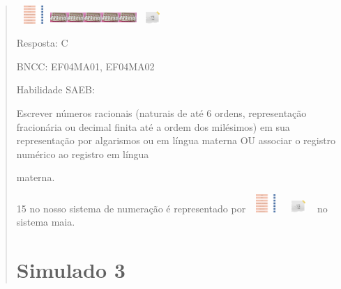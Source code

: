 \begin{enumerate}
\begin{escolha}
\begin{enumerate}
\begin{itemize}
\begin{itemize}
\begin{escolha}
\begin{quote}
\begin{escolha}
{\begin{enumerate}
  \includegraphics[width=0.50004in,height=0.26669in]{media/image14.png}\includegraphics[width=0.25836in,height=0.18335in]{media/image15.png}\includegraphics[width=0.25836in,height=0.18335in]{media/image15.png}\includegraphics[width=0.25836in,height=0.18335in]{media/image15.png}\includegraphics[width=0.25836in,height=0.18335in]{media/image15.png}\includegraphics[width=0.25836in,height=0.18335in]{media/image15.png}\includegraphics[width=0.47504in,height=0.18335in]{media/image16.png}
\end{enumerate}

Resposta: C

BNCC: EF04MA01, EF04MA02

Habilidade SAEB:

Escrever números racionais (naturais de até 6 ordens, representação
fracionária ou decimal finita até a ordem dos milésimos) em sua
representação por algarismos ou em língua materna OU associar o registro
numérico ao registro em língua

materna.

15 no nosso sistema de numeração é representado por
\includegraphics[width=0.50004in,height=0.26669in]{media/image14.png}\includegraphics[width=0.47504in,height=0.18335in]{media/image16.png}
no sistema maia.

\section{Simulado 3}\label{simulado-3}

}
\end{escolha}
\end{quote}
\end{escolha}
\end{itemize}
\end{itemize}
\end{enumerate}
\end{escolha}
\end{enumerate}
